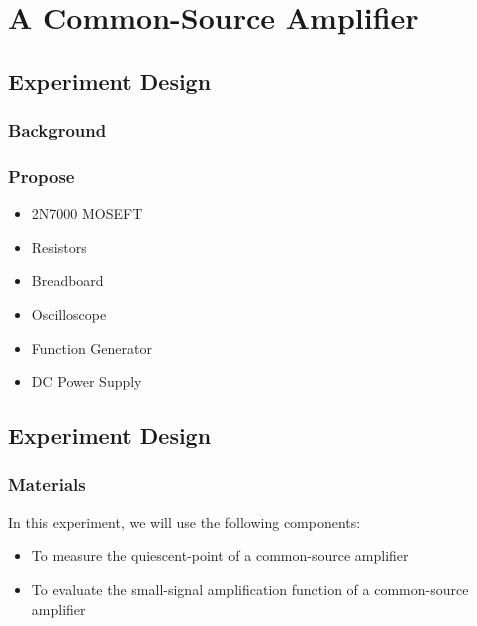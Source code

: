 \section{A Common-Source Amplifier}

\subsection{Experiment Design}
    \subsubsection{Background}


    \subsubsection{Propose}
    \begin{itemize}
        \item 2N7000 MOSEFT
        \item Resistors
        \item Breadboard
        \item Oscilloscope
        \item Function Generator
        \item DC Power Supply
    \end{itemize}

\subsection{Experiment Design}
    \subsubsection{Materials}
        In this experiment, we will use the following components:
        \begin{itemize}
            \item To measure the quiescent-point of a common-source amplifier
            \item To evaluate the small-signal amplification function of a common-source amplifier
        \end{itemize}


